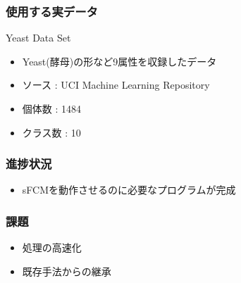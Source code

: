 \documentclass[13pt,dvipdfmx]{beamer}
\begin{document}
\begin{frame}\frametitle{使用する実データ}
  \begin{block}{Yeast Data Set}
    \begin{itemize}
    \item Yeast(酵母)の形など9属性を収録したデータ
    \item ソース : UCI  Machine Learning Repository
    \item 個体数 : 1484
    \item クラス数 : 10
    \end{itemize}
  \end{block}
\end{frame}

\begin{frame}\frametitle{進捗状況}
\begin{itemize}
 \item sFCMを動作させるのに必要なプログラムが完成
\end{itemize}
\end{frame}

\begin{frame}\frametitle{課題}
\begin{itemize}
\item 処理の高速化
\item 既存手法からの継承
\end{itemize}
\end{frame}
\end{document}

